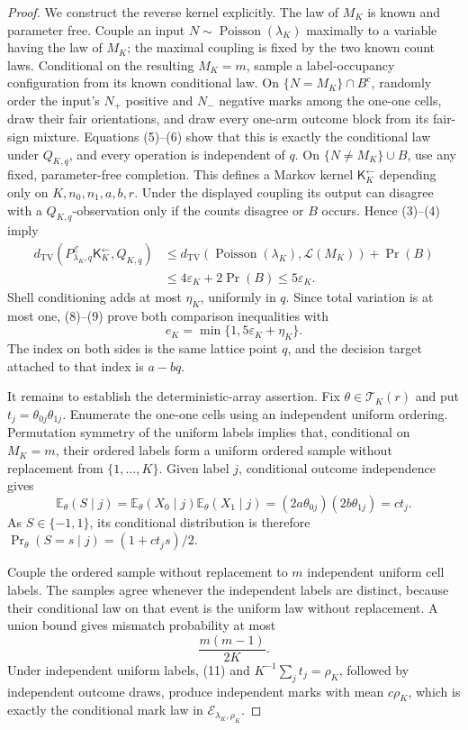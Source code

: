 \documentclass{article}
\begin{document}
\begin{proof}
We construct the reverse kernel explicitly.  The law of \(M_K\) is
known and parameter free.  Couple an input
\(N\sim\operatorname{Poisson}(\lambda_K)\) maximally to a variable having
the law of \(M_K\); the maximal coupling is fixed by the two known count
laws.  Conditional on the resulting \(M_K=m\), sample a label-occupancy
configuration from its known conditional law.  On
\(\{N=M_K\}\cap B^{\mathrm c}\), randomly order the input's \(N_+\)
positive and \(N_-\) negative marks among the one-one cells, draw their
fair orientations, and draw every one-arm outcome block from its
fair-sign mixture.  Equations (5)--(6) show that this is exactly the
conditional law under \(Q_{K,q}\), and every operation is independent
of \(q\).  On \(\{N\ne M_K\}\cup B\), use any fixed, parameter-free
completion.  This defines a Markov kernel
\(\mathsf K_K^{\leftarrow}\) depending only on
\(K,n_0,n_1,a,b,r\).  Under the displayed coupling its output can
disagree with a \(Q_{K,q}\)-observation only if the counts disagree or
\(B\) occurs.  Hence (3)--(4) imply
\[
\begin{aligned}
 d_{\mathrm{TV}}\!\left(
 P^{\mathcal E}_{\lambda_K,q}\mathsf K_K^{\leftarrow},Q_{K,q}\right)
 &\le
 d_{\mathrm{TV}}\!\left(
 \operatorname{Poisson}(\lambda_K),\mathcal L(M_K)\right)+\Pr(B)\\
 &\le4\varepsilon_K+2\Pr(B)
 \le5\varepsilon_K.
\end{aligned}
\tag{9}
\]
Shell conditioning adds at most \(\eta_K\), uniformly in \(q\).  Since
total variation is at most one, (8)--(9) prove both comparison
inequalities with
\[
 e_K=\min\{1,5\varepsilon_K+\eta_K\}.
 \tag{10}
\]
The index on both sides is the same lattice point \(q\), and the
decision target attached to that index is \(a-bq\).

It remains to establish the deterministic-array assertion.  Fix
\(\theta\in\mathcal T_K(r)\) and put
\(t_j=\theta_{0j}\theta_{1j}\).  Enumerate the one-one cells using an
independent uniform ordering.  Permutation symmetry of the uniform
labels implies that, conditional on \(M_K=m\), their ordered labels form
a uniform ordered sample without replacement from
\(\{1,\ldots,K\}\).  Given label \(j\), conditional outcome independence
gives
\[
 \mathbb E_\theta(S\mid j)
 =
 \mathbb E_\theta(X_0\mid j)\mathbb E_\theta(X_1\mid j)
 =(2a\theta_{0j})(2b\theta_{1j})
 =ct_j.
 \tag{11}
\]
As \(S\in\{-1,1\}\), its conditional distribution is therefore
\(\Pr_\theta(S=s\mid j)=(1+ct_js)/2\).

Couple the ordered sample without replacement to \(m\) independent
uniform cell labels.  The samples agree whenever the independent labels
are distinct, because their conditional law on that event is the
uniform law without replacement.  A union bound gives mismatch
probability at most
\[
 \frac{m(m-1)}{2K}.
 \tag{12}
\]
Under independent uniform labels, (11) and
\(K^{-1}\sum_jt_j=\rho_K\), followed by independent outcome draws,
produce independent marks with mean \(c\rho_K\), which is exactly the
conditional mark law in \(\mathcal E_{\lambda_K,\rho_K}\).


\end{proof}
\end{document}
